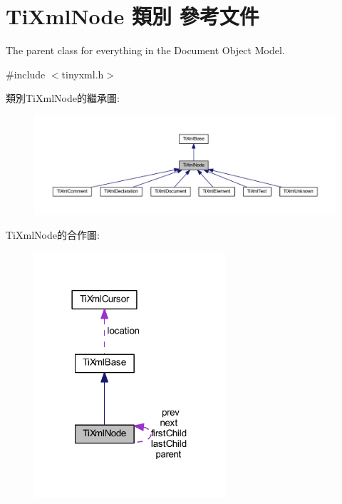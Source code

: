 \hypertarget{class_ti_xml_node}{}\section{Ti\+Xml\+Node 類別 參考文件}
\label{class_ti_xml_node}


The parent class for everything in the Document Object Model.  




{\ttfamily \#include $<$tinyxml.\+h$>$}



類別\+Ti\+Xml\+Node的繼承圖\+:\nopagebreak
\begin{figure}[H]
\begin{center}
\leavevmode
\includegraphics[width=350pt]{class_ti_xml_node__inherit__graph}
\end{center}
\end{figure}


Ti\+Xml\+Node的合作圖\+:\nopagebreak
\begin{figure}[H]
\begin{center}
\leavevmode
\includegraphics[width=201pt]{class_ti_xml_node__coll__graph}
\end{center}
\end{figure}
